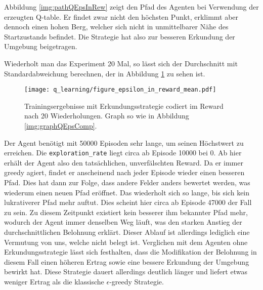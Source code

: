 Abbildung \ref{img:pathQEpsInRew} zeigt den Pfad des Agenten bei Verwendung der erzeugten Q-table. Er findet zwar nicht den höchsten Punkt, erklimmt aber dennoch einen hohen Berg, welcher sich nicht in unmittelbarer Nähe des Startzustands befindet. Die Strategie hat also zur besseren Erkundung der Umgebung beigetragen.

Wiederholt man das Experiment 20 Mal, so lässt sich der Durchschnitt mit Standardabweichung berechnen, der in Abbildung \ref{img:graphQEpsInRewMean} zu sehen ist.
\begin{figure}[H]
    \centering
    \texttt{[image: q\_learning/figure\_epsilon\_in\_reward\_mean.pdf]}
    \caption{Trainingsergebnisse mit Erkundungsstrategie codiert im Reward nach 20 Wiederholungen. Graph so wie in Abbildung \ref{img:graphQEpsComp}.} \label{img:graphQEpsInRewMean}
\end{figure}
Der Agent benötigt mit 50000 Episoden sehr lange, um seinen Höchstwert zu erreichen. Die \texttt{exploration_rate} liegt circa ab Episode 10000 bei 0. Ab hier erhält der Agent also den tatsächlichen, unverfälschten Reward. Da er immer greedy agiert, findet er anscheinend nach jeder Episode wieder einen besseren Pfad. Dies hat dann zur Folge, dass andere Felder anders bewertet werden, was wiederum einen neuen Pfad eröffnet. Das wiederholt sich so lange, bis sich kein lukrativerer Pfad mehr auftut. Dies scheint hier circa ab Episode 47000 der Fall zu sein. Zu diesem Zeitpunkt existiert kein besserer ihm bekannter Pfad mehr, wodurch der Agent immer denselben Weg läuft, was den starken Anstieg der durchschnittlichen Belohnung erklärt. Dieser Ablauf ist allerdings lediglich eine Vermutung von uns, welche nicht belegt ist. Verglichen mit dem Agenten ohne Erkundungsstrategie lässt sich festhalten, dass die Modifikation der Belohnung in diesem Fall einen höheren Ertrag sowie eine bessere Erkundung der Umgebung bewirkt hat. Diese Strategie dauert allerdings deutlich länger und liefert etwas weniger Ertrag als die klassische $ \epsilon $-greedy Strategie.